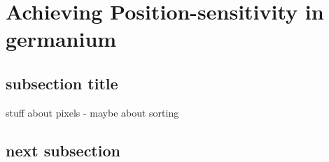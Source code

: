\chapter{Achieving Position-sensitivity in germanium}
\label{ch:Achieving Position-sensitivity in germanium}
\section{subsection title}
\indent stuff about pixels - maybe about sorting



\section{next subsection}
\indent 




 


 